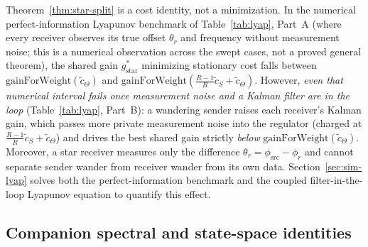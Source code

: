 \documentclass[11pt,a4paper]{article}
\theoremstyle{definition}
\begin{document}
Theorem~\ref{thm:star-split} is a cost identity, not a minimization. In the
numerical perfect-information Lyapunov benchmark of Table~\ref{tab:lyap},
Part~A (where every receiver observes its true offset $\theta_r$ and frequency
without measurement noise; this is a numerical observation across the swept
cases, not a proved general theorem), the shared gain $g_{\mathrm{star}}^*$
minimizing stationary cost falls between $\mathrm{gainForWeight}(\tilde c_\Theta)$
and $\mathrm{gainForWeight}(\frac{R-1}{R}\tilde c_S + \tilde c_\Theta)$.
However, \emph{even that numerical interval fails once measurement noise and a
Kalman filter are in the loop} (Table~\ref{tab:lyap}, Part~B): a wandering
sender raises each receiver's Kalman gain, which passes more private measurement
noise into the regulator (charged at $\frac{R-1}{R}\tilde c_S + \tilde c_\Theta$)
and drives the best shared gain strictly \emph{below}
$\mathrm{gainForWeight}(\tilde c_\Theta)$. Moreover, a star receiver measures
only the difference $\theta_r = \phi_{\mathrm{src}} - \phi_r$ and cannot
separate sender wander from receiver wander from its own data.
Section~\ref{sec:sim-lyap} solves both the perfect-information benchmark and
the coupled filter-in-the-loop Lyapunov equation to quantify this effect.

\subsection{Companion spectral and state-space identities}
\end{document}
